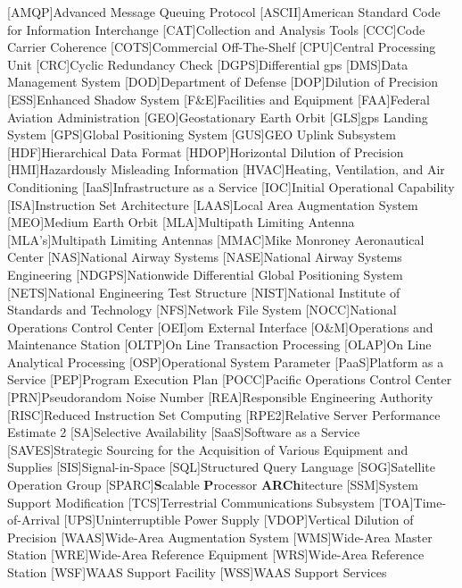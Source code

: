 \begin{acronym}[WAAS]
[AMQP]{Advanced Message Queuing Protocol}
[ASCII]{American Standard Code for Information Interchange}
[CAT]{Collection and Analysis Tools}
[CCC]{Code Carrier Coherence}
[COTS]{Commercial Off-The-Shelf}
[CPU]{Central Processing Unit}
[CRC]{Cyclic Redundancy Check}
[DGPS]{Differential \ac{gps}}
[DMS]{Data Management System}
[DOD]{Department of Defense}
[DOP]{Dilution of Precision}
[ESS]{Enhanced Shadow System}
[F\&E]{Facilities and Equipment}
[FAA]{Federal Aviation Administration}
[GEO]{Geostationary Earth Orbit}
[GLS]{\ac{gps} Landing System}
[GPS]{Global Positioning System}
[GUS]{GEO Uplink Subsystem}
[HDF]{Hierarchical Data Format}
[HDOP]{Horizontal Dilution of Precision}
[HMI]{Hazardously Misleading Information}
[HVAC]{Heating, Ventilation, and Air Conditioning}
[IaaS]{Infrastructure as a Service}
[IOC]{Initial Operational Capability}
[ISA]{Instruction Set Architecture}
[LAAS]{Local Area Augmentation System}
[MEO]{Medium Earth Orbit}
[MLA]{Multipath Limiting Antenna}
[MLA's]{Multipath Limiting Antennas}
[MMAC]{Mike Monroney Aeronautical Center}
[NAS]{National Airway Systems}
[NASE]{National Airway Systems Engineering}
[NDGPS]{Nationwide Differential Global Positioning System}
[NETS]{National Engineering Test Structure}
[NIST]{National Institute of Standards and Technology}
[NFS]{Network File System}
[NOCC]{National Operations Control Center}
[OEI]{\ac{om} External Interface}
[O\&M]{Operations and Maintenance Station}
[OLTP]{On Line Transaction Processing}
[OLAP]{On Line Analytical Processing}
[OSP]{Operational System Parameter}
[PaaS]{Platform as a Service}
[PEP]{Program Execution Plan}
[POCC]{Pacific Operations Control Center}
[PRN]{Pseudorandom Noise Number}
[REA]{Responsible Engineering Authority}
[RISC]{Reduced Instruction Set Computing}
[RPE2]{Relative Server Performance Estimate 2}
[SA]{Selective Availability}
[SaaS]{Software as a Service}
[SAVES]{Strategic Sourcing for the Acquisition of Various Equipment and Supplies}
[SIS]{Signal-in-Space}
[SQL]{Structured Query Language}
[SOG]{Satellite Operation Group}
[SPARC]{\textbf{S}calable \textbf{P}rocessor \textbf{ARCh}itecture}
[SSM]{System Support Modification}
[TCS]{Terrestrial Communications Subsystem}
[TOA]{Time-of-Arrival}
[UPS]{Uninterruptible Power Supply}
[VDOP]{Vertical Dilution of Precision}
[WAAS]{Wide-Area Augmentation System}
[WMS]{Wide-Area Master Station}
[WRE]{Wide-Area Reference Equipment}
[WRS]{Wide-Area Reference Station}
[WSF]{WAAS Support Facility}
[WSS]{WAAS Support Services}
\end{acronym}
